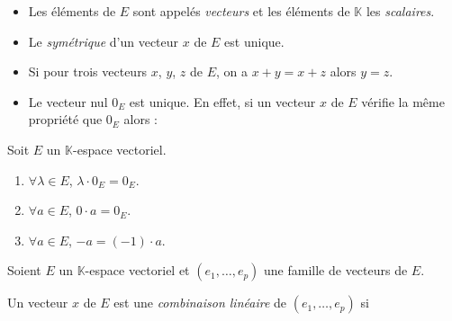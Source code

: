 \documentclass[french,11pt,twoside]{VcCours}
\begin{document}
\begin{Remarques}{}
\begin{itemize}
\item Les éléments de $E$ sont appelés \emph{vecteurs} et les éléments de $\mathbb{K}$ les \emph{scalaires}.
\item Le \emph{symétrique} d'un vecteur $x$ de $E$ est unique. 
\item Si pour trois vecteurs $x$, $y$, $z$ de $E$, on a $x+y=x+z$ alors $y=z$. 
\item Le vecteur nul $0_E$ est unique. En effet, si un vecteur $x$ de $E$ vérifie la même propriété que $0_E$ alors :

\vspace{1.5cm}
\end{itemize}
\end{Remarques}{}

\begin{Proposition}{}
Soit $E$ un $\mathbb{K}$-espace vectoriel.

\begin{enumerate}
\item $\forall \lambda \in E$, $\lambda \cdot 0_E= 0_E$.
\item $\forall a \in E$, $0 \cdot a=0_E$.
\item $\forall a \in E$, $-a=(-1) \cdot a$.
\end{enumerate}
\end{Proposition}

\medskip


\medskip

\begin{Definition}{} Soient $E$ un $\mathbb{K}$-espace vectoriel et $(e_1, \ldots, e_p)$ une famille de vecteurs de $E$.

Un vecteur $x$ de $E$ est une \emph{combinaison linéaire} de $(e_1, \ldots, e_p)$ si 
$$ \phantom{x = \sum_{k=1}^p \lambda_k e_k = \lambda_1 e_1 + \lambda_2 e_2 + \cdots + \lambda_p e_p }$$
\end{Definition}
\end{document}
